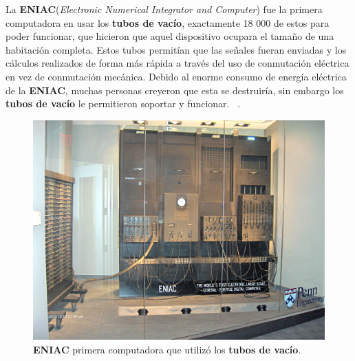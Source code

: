 \indent La \textbf{ENIAC}(\emph{Electronic Numerical Integrator and Computer}) fue la primera computadora en usar los \textbf{tubos de vacío}, exactamente
18 000 de estos para poder funcionar, que hicieron que aquel dispositivo ocupara el tamaño de una habitación completa. Estos tubos permitían que las
señales fueran enviadas y los cálculos realizados de forma más rápida a través del uso de conmutación eléctrica en vez de conmutación mecánica. 
Debido al enorme consumo de energía eléctrica de la \textbf{ENIAC}, muchas personas creyeron que esta se destruiría, sin embargo los \textbf
{tubos de vacío} le permitieron soportar y funcionar. ~.\\

\begin{figure}[htb]
	\centering
	\includegraphics[scale = 0.13]{Graphics/ENIAC.jpg}
	\caption{\textbf{ENIAC} primera computadora que utilizó los \textbf{tubos de vacío}.}
	\label{fig:1}
\end{figure}

